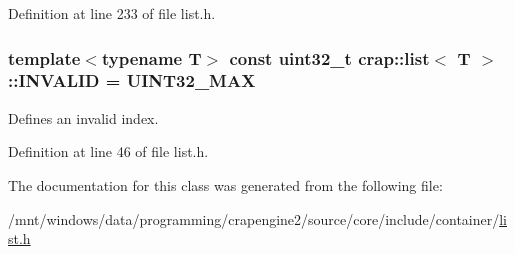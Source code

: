 Definition at line 233 of file list.\+h.

\hypertarget{classcrap_1_1list_af6ca677970fb2d6f6f22b82d89e9b183}{}
\subsubsection[{I\+N\+V\+A\+L\+I\+D}]{\setlength{\rightskip}{0pt plus 5cm}template$<$typename T$>$ const uint32\+\_\+t {\bf crap\+::list}$<$ T $>$\+::I\+N\+V\+A\+L\+I\+D = {\bf U\+I\+N\+T32\+\_\+\+M\+A\+X}\hspace{0.3cm}{\ttfamily [static]}}\label{classcrap_1_1list_af6ca677970fb2d6f6f22b82d89e9b183}


Defines an invalid index. 



Definition at line 46 of file list.\+h.



The documentation for this class was generated from the following file\+:\begin{DoxyCompactItemize}
\item 
/mnt/windows/data/programming/crapengine2/source/core/include/container/\hyperlink{list_8h}{list.\+h}\end{DoxyCompactItemize}
